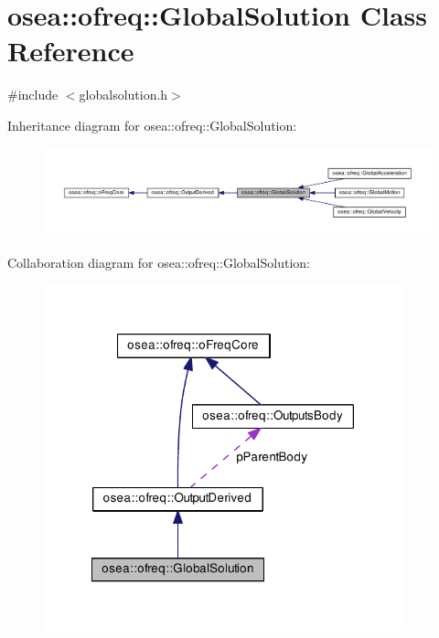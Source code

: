 \hypertarget{classosea_1_1ofreq_1_1_global_solution}{\section{osea\-:\-:ofreq\-:\-:Global\-Solution Class Reference}
\label{classosea_1_1ofreq_1_1_global_solution}
}


{\ttfamily \#include $<$globalsolution.\-h$>$}



Inheritance diagram for osea\-:\-:ofreq\-:\-:Global\-Solution\-:\nopagebreak
\begin{figure}[H]
\begin{center}
\leavevmode
\includegraphics[width=350pt]{classosea_1_1ofreq_1_1_global_solution__inherit__graph}
\end{center}
\end{figure}


Collaboration diagram for osea\-:\-:ofreq\-:\-:Global\-Solution\-:
\nopagebreak
\begin{figure}[H]
\begin{center}
\leavevmode
\includegraphics[width=294pt]{classosea_1_1ofreq_1_1_global_solution__coll__graph}
\end{center}
\end{figure}
